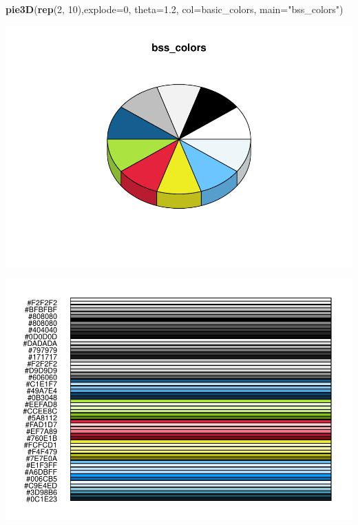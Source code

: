 \documentclass[
]{article}
\newenvironment{Shaded}{\begin{snugshade}}{\end{snugshade}}
\newcommand{\CommentTok}[1]{\textcolor[rgb]{0.56,0.35,0.01}{\textit{#1}}}
\newcommand{\DataTypeTok}[1]{\textcolor[rgb]{0.13,0.29,0.53}{#1}}
\newcommand{\DecValTok}[1]{\textcolor[rgb]{0.00,0.00,0.81}{#1}}
\newcommand{\FloatTok}[1]{\textcolor[rgb]{0.00,0.00,0.81}{#1}}
\newcommand{\KeywordTok}[1]{\textcolor[rgb]{0.13,0.29,0.53}{\textbf{#1}}}
\newcommand{\NormalTok}[1]{#1}
\newcommand{\OperatorTok}[1]{\textcolor[rgb]{0.81,0.36,0.00}{\textbf{#1}}}
\newcommand{\StringTok}[1]{\textcolor[rgb]{0.31,0.60,0.02}{#1}}
\begin{document}
\begin{Shaded}
\begin{Highlighting}[]

\KeywordTok{pie3D}\NormalTok{(}\KeywordTok{rep}\NormalTok{(}\DecValTok{2}\NormalTok{, }\DecValTok{10}\NormalTok{),}\DataTypeTok{explode=}\DecValTok{0}\NormalTok{, }\DataTypeTok{theta=}\FloatTok{1.2}\NormalTok{, }\DataTypeTok{col=}\NormalTok{basic\_colors, }\DataTypeTok{main=}\StringTok{"bss\_colors"}\NormalTok{)}
\end{Highlighting}
\end{Shaded}

\includegraphics[width=1\linewidth]{man/figures/README-unnamed-chunk-2-1}

\begin{Shaded}
\end{Shaded}

\includegraphics[width=1\linewidth]{man/figures/README-unnamed-chunk-2-2}
\end{document}
